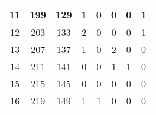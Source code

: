 \begin{table}[!h]
\begin{tabular}{|c|c|c|c|c|c|c|c|}
		11                                                & 199                                               & 129                                               & 1                                                 & 0                                                 & 0                                                 & 0                                                 & 1                                                 \\ \hline
		12                                                & 203                                               & 133                                               & 2                                                 & 0                                                 & 0                                                 & 0                                                 & 1                                                 \\ \hline
		13                                                & 207                                               & 137                                               & 1                                                 & 0                                                 & 2                                                 & 0                                                 & 0                                                 \\ \hline
		14                                                & 211                                               & 141                                               & 0                                                 & 0                                                 & 1                                                 & 1                                                 & 0                                                 \\ \hline
		15                                                & 215                                               & 145                                               & 0                                                 & 0                                                 & 0                                                 & 0                                                 & 0                                                 \\ \hline
		16                                                & 219                                               & 149                                               & 1                                                 & 1                                                 & 0                                                 & 0                                                 & 0                                                 \\ \hline

\end{tabular}
\end{table}
